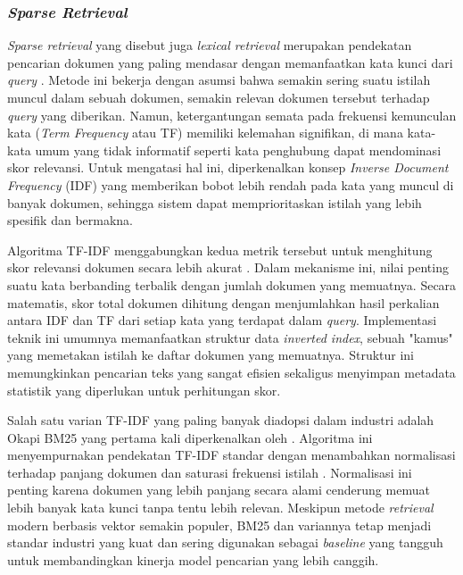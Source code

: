 \subsubsection{\textit{Sparse Retrieval}}
\textit{Sparse retrieval} yang disebut juga \textit{lexical retrieval} merupakan pendekatan pencarian dokumen yang paling mendasar dengan memanfaatkan kata kunci dari \textit{query} \parencite{huyenAIEngineeringBuilding2025}. Metode ini bekerja dengan asumsi bahwa semakin sering suatu istilah muncul dalam sebuah dokumen, semakin relevan dokumen tersebut terhadap \textit{query} yang diberikan. Namun, ketergantungan semata pada frekuensi kemunculan kata (\textit{Term Frequency} atau TF) memiliki kelemahan signifikan, di mana kata-kata umum yang tidak informatif seperti kata penghubung dapat mendominasi skor relevansi. Untuk mengatasi hal ini, diperkenalkan konsep \textit{Inverse Document Frequency} (IDF) yang memberikan bobot lebih rendah pada kata yang muncul di banyak dokumen, sehingga sistem dapat memprioritaskan istilah yang lebih spesifik dan bermakna.

Algoritma TF-IDF menggabungkan kedua metrik tersebut untuk menghitung skor relevansi dokumen secara lebih akurat \parencite{huyenAIEngineeringBuilding2025}. Dalam mekanisme ini, nilai penting suatu kata berbanding terbalik dengan jumlah dokumen yang memuatnya. Secara matematis, skor total dokumen dihitung dengan menjumlahkan hasil perkalian antara IDF dan TF dari setiap kata yang terdapat dalam \textit{query}. Implementasi teknik ini umumnya memanfaatkan struktur data \textit{inverted index}, sebuah "kamus" yang memetakan istilah ke daftar dokumen yang memuatnya. Struktur ini memungkinkan pencarian teks yang sangat efisien sekaligus menyimpan metadata statistik yang diperlukan untuk perhitungan skor.

Salah satu varian TF-IDF yang paling banyak diadopsi dalam industri adalah Okapi BM25 yang pertama kali diperkenalkan oleh \textcite{harman1995trec3}. Algoritma ini menyempurnakan pendekatan TF-IDF standar dengan menambahkan normalisasi terhadap panjang dokumen dan saturasi frekuensi istilah \parencite{huyenAIEngineeringBuilding2025}. Normalisasi ini penting karena dokumen yang lebih panjang secara alami cenderung memuat lebih banyak kata kunci tanpa tentu lebih relevan. Meskipun metode \textit{retrieval} modern berbasis vektor semakin populer, BM25 dan variannya tetap menjadi standar industri yang kuat dan sering digunakan sebagai \textit{baseline} yang tangguh untuk membandingkan kinerja model pencarian yang lebih canggih.

